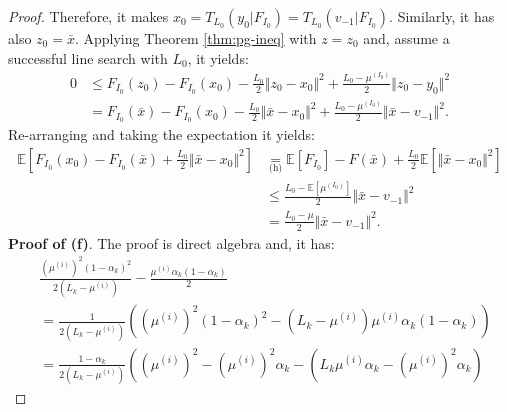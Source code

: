 \documentclass[12pt]{article}
\begin{document}
\begin{proof}
            Therefore, it makes $x_0 = T_{L_0}(y_0 | F_{I_0}) = T_{L_0}(v_{-1} | F_{I_0})$. 
            Similarly, it has also $z_0 = \bar x$.
            Applying Theorem \ref{thm:pg-ineq} with $z = z_0$ and, assume a successful line search with $L_0$, it yields: 
            \begin{align*}
                0 &\le F_{I_0}(z_0) - F_{I_0}(x_0) - \frac{L_0}{2}\Vert z_0 - x_0\Vert^2 + \frac{L_0 - \mu^{(I_0)}}{2}\Vert z_0 - y_0\Vert^2
                \\
                &= F_{I_0}(\bar x) - F_{I_0}(x_0) - \frac{L_0}{2}\Vert \bar x - x_0\Vert^2 + \frac{L_0 - \mu^{(I_0)}}{2}\Vert \bar x - v_{-1}\Vert^2. 
            \end{align*}
            Re-arranging and taking the expectation it yields: 
            \begin{align*}
                \mathbb E \left[
                    F_{I_0}(x_0) - F_{I_0}(\bar x) + \frac{L_0}{2}\Vert \bar x - x_0\Vert^2
                \right]
                &\underset{\text{(h)}}{=}
                \mathbb E \left[ F_{I_0}\right] - F(\bar x) 
                + \frac{L_0}{2}\mathbb E \left[\Vert \bar x - x_0\Vert^2\right]
                \\
                &\le \frac{L_0 - \mathbb E \left[\mu^{(I_0)}\right]}{2}\Vert \bar x - v_{-1}\Vert^2
                \\
                &= \frac{L_0 - \mu}{2}\Vert \bar x - v_{-1}\Vert^2. 
            \end{align*}
            \textbf{Proof of (f)}. 
            The proof is direct algebra and, it has: 
            {\small\allowdisplaybreaks
            \begin{align*}
                & \frac{\left(\mu^{(i)}\right)^2(1 - \alpha_k)^2}{2(L_k - \mu^{(i)})} 
                - \frac{\mu^{(i)}\alpha_k(1 - \alpha_k)}{2}
                \\
                &= 
                \frac{1}{2\left(L_k - \mu^{(i)}\right)}
                \left(
                    \left(\mu^{(i)}\right)^2(1 - \alpha_k)^2
                    - \left(L_k - \mu^{(i)}\right)\mu^{(i)} \alpha_k(1 - \alpha_k)
                \right)
                \\
                &= \frac{1 - \alpha_k}{2\left(L_k - \mu^{(i)}\right)}\left(
                    \left(\mu^{(i)}\right)^2 
                    - \left(\mu^{(i)}\right)^2\alpha_k 
                    - \left(L_k \mu^{(i)} \alpha_k - \left(\mu^{(i)}\right)^2 \alpha_k\right)

\end{align*}}
\end{proof}
\end{document}
